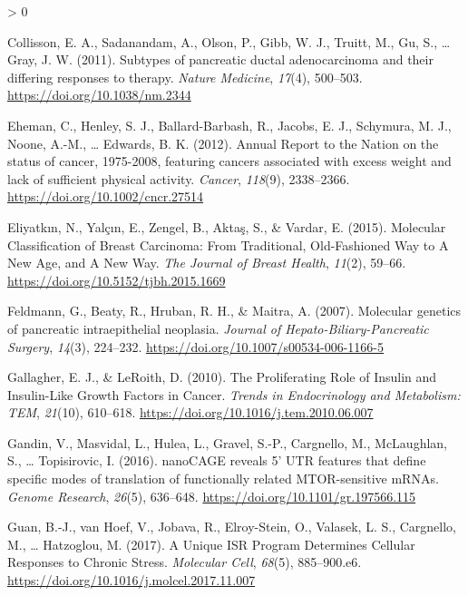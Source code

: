\documentclass[
  12pt,
  openany]{book}
\newlength{\cslhangindent}
\newenvironment{CSLReferences}[2] %
 {%
  \setlength{\parindent}{0pt}
  \ifodd #1 \everypar{\setlength{\hangindent}{\cslhangindent}}\ignorespaces\fi
  \ifnum #2 > 0
  \setlength{\parskip}{#2\baselineskip}
  \fi
 }%
 {}
\begin{document}
\begin{CSLReferences}{1}{0}
\leavevmode\hypertarget{ref-Collisson2011}{}%
Collisson, E. A., Sadanandam, A., Olson, P., Gibb, W. J., Truitt, M., Gu, S., \ldots{} Gray, J. W. (2011). Subtypes of pancreatic ductal adenocarcinoma and their differing responses to therapy. \emph{Nature Medicine}, \emph{17}(4), 500--503. \url{https://doi.org/10.1038/nm.2344}

\leavevmode\hypertarget{ref-Eheman2012}{}%
Eheman, C., Henley, S. J., Ballard-Barbash, R., Jacobs, E. J., Schymura, M. J., Noone, A.-M., \ldots{} Edwards, B. K. (2012). Annual {Report} to the {Nation} on the status of cancer, 1975-2008, featuring cancers associated with excess weight and lack of sufficient physical activity. \emph{Cancer}, \emph{118}(9), 2338--2366. \url{https://doi.org/10.1002/cncr.27514}

\leavevmode\hypertarget{ref-Eliyatkin2015}{}%
Eliyatkın, N., Yalçın, E., Zengel, B., Aktaş, S., \& Vardar, E. (2015). Molecular {Classification} of {Breast Carcinoma}: {From Traditional}, {Old}-{Fashioned Way} to {A New Age}, and {A New Way}. \emph{The Journal of Breast Health}, \emph{11}(2), 59--66. \url{https://doi.org/10.5152/tjbh.2015.1669}

\leavevmode\hypertarget{ref-Feldmann2007}{}%
Feldmann, G., Beaty, R., Hruban, R. H., \& Maitra, A. (2007). Molecular genetics of pancreatic intraepithelial neoplasia. \emph{Journal of Hepato-Biliary-Pancreatic Surgery}, \emph{14}(3), 224--232. \url{https://doi.org/10.1007/s00534-006-1166-5}

\leavevmode\hypertarget{ref-Gallagher2010}{}%
Gallagher, E. J., \& LeRoith, D. (2010). The {Proliferating Role} of {Insulin} and {Insulin}-{Like Growth Factors} in {Cancer}. \emph{Trends in Endocrinology and Metabolism: TEM}, \emph{21}(10), 610--618. \url{https://doi.org/10.1016/j.tem.2010.06.007}

\leavevmode\hypertarget{ref-Gandin2016a}{}%
Gandin, V., Masvidal, L., Hulea, L., Gravel, S.-P., Cargnello, M., McLaughlan, S., \ldots{} Topisirovic, I. (2016). {nanoCAGE} reveals 5' {UTR} features that define specific modes of translation of functionally related {MTOR}-sensitive {mRNAs}. \emph{Genome Research}, \emph{26}(5), 636--648. \url{https://doi.org/10.1101/gr.197566.115}

\leavevmode\hypertarget{ref-Guan2017}{}%
Guan, B.-J., van Hoef, V., Jobava, R., Elroy-Stein, O., Valasek, L. S., Cargnello, M., \ldots{} Hatzoglou, M. (2017). A {Unique ISR Program Determines Cellular Responses} to {Chronic Stress}. \emph{Molecular Cell}, \emph{68}(5), 885--900.e6. \url{https://doi.org/10.1016/j.molcel.2017.11.007}


\end{CSLReferences}
\end{document}
